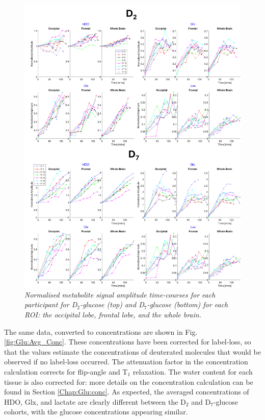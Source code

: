 \begin{figure}
    \centering
    \includegraphics[width = 1\textwidth]{Figures/Glucose/Ind_Amp.png}
    \caption{\textit{Normalised metabolite signal amplitude time-courses for each participant for D$_2$-glucose (top) and D$_7$-glucose (bottom) for each \ac{ROI}: the occipital lobe, frontal lobe, and the whole brain.}}
    \label{fig:Glu:Ind_Amp}
\end{figure}

The same data, converted to concentrations are shown in Fig. \ref{fig:Glu:Avg_Conc}. These concentrations have been corrected for label-loss, so that the values estimate the concentrations of deuterated molecules that would be observed if no label-loss occurred. The attenuation factor in the concentration calculation corrects for flip-angle and T$_1$ relaxation. The water content for each tissue is also corrected for: more details on the concentration calculation can be found in Section \ref{Chap:Glu:conc}. As expected, the averaged concentrations of \ac{HDO}, Glx, and lactate are clearly different between the D$_2$ and D$_7$-glucose cohorts, with the glucose concentrations appearing similar. 

